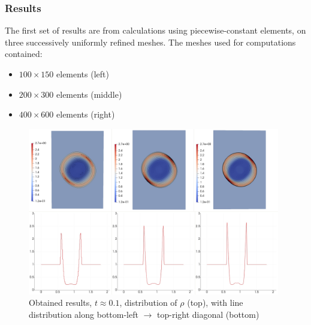 \subsubsection{Results}
The first set of results are from calculations using piecewise-constant elements, on three successively uniformly refined meshes. The meshes used for computations  contained:
\begin{itemize}
\item $100 \times 150$ elements (left)
\item $200 \times 300$ elements (middle)
\item $400 \times 600$ elements (right)
\end{itemize}

\begin{figure}[H]
	\begin{center}
		\includegraphics[width=0.98\textwidth]{img/mhd-blast/new/blast,noadapt1.jpg}
\vspace{-3mm}
	\caption{Obtained results, $t \approx 0.1$, distribution of $\rho$ (top), with line distribution along bottom-left $\rightarrow$ top-right diagonal (bottom)}
	\label{figure:blastNew01}
	\end{center}
\end{figure}
\vspace{-10mm}

